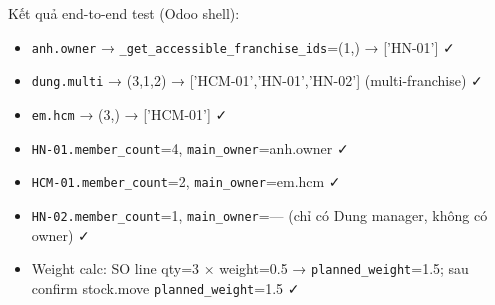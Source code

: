Kết quả end-to-end test (Odoo shell):
\begin{itemize}
    \item \texttt{anh.owner} → \texttt{\_get\_accessible\_franchise\_ids}=(1,) → ['HN-01'] ✓
    \item \texttt{dung.multi} → (3,1,2) → ['HCM-01','HN-01','HN-02'] (multi-franchise) ✓
    \item \texttt{em.hcm} → (3,) → ['HCM-01'] ✓
    \item \texttt{HN-01.member\_count}=4, \texttt{main\_owner}=anh.owner ✓
    \item \texttt{HCM-01.member\_count}=2, \texttt{main\_owner}=em.hcm ✓
    \item \texttt{HN-02.member\_count}=1, \texttt{main\_owner}=— (chỉ có Dung manager, không có owner) ✓
    \item Weight calc: SO line qty=3 × weight=0.5 → \texttt{planned\_weight}=1.5; sau confirm stock.move \texttt{planned\_weight}=1.5 ✓
\end{itemize}


